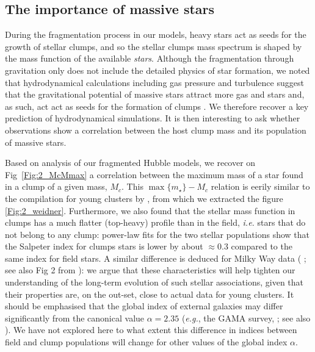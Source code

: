\subsection*{The importance of massive stars}


During the fragmentation process in our models, heavy stars act as seeds for the growth of stellar clumps, and so the stellar clumps mass spectrum is shaped by the mass function of the available {\it stars}. Although the fragmentation through gravitation only does not include the detailed physics of star formation, we noted that hydrodynamical calculations including gas pressure and turbulence suggest that the gravitational potential of massive stars attract more gas and stars and, as such, act act as seeds for the formation of clumps \citep{Bonnell2004}. We therefore recover a key prediction of hydrodynamical simulations. It is then interesting to ask whether observations show a correlation between the host clump mass and its population of massive stars.

 Based on analysis of our fragmented Hubble models, we recover on Fig~\ref{Fig:2_McMmax} a correlation between the maximum mass of a star found in a clump of a given mass, $M_c$. This $\max\{m_\star\} - M_c $ relation is eerily similar to the compilation for young clusters by \citet{Weidner2013}, from which we extracted the figure \ref{Fig:2_weidner}. Furthermore, we also found that the stellar mass function in clumps has a much flatter (top-heavy) profile than in the field, {\it i.e.} stars that do not belong to any clump: power-law fits for the two stellar populations show that the Salpeter index for clumps stars is lower by about $\approx 0.3$ compared to the same index for field stars. A similar difference is deduced for Milky Way data ( \citealt{Czekaj2014,Rybizki2015}; see also Fig 2 from \citealt{Bastian2010}):  we argue that these characteristics will help tighten our understanding of the long-term evolution of such stellar associations, given that their properties are, on the out-set, close to actual data for young clusters. It should be emphasised that the global index of external galaxies may differ significantly from the canonical value $\alpha = 2.35$ ({\it e.g.}, the GAMA survey, \citealt{Gunawardhana2011}; see also \citealt{Hoversten2008}). We have not explored here to what extent this difference in indices  between field and clump populations will change for other values of the global index $\alpha$.

